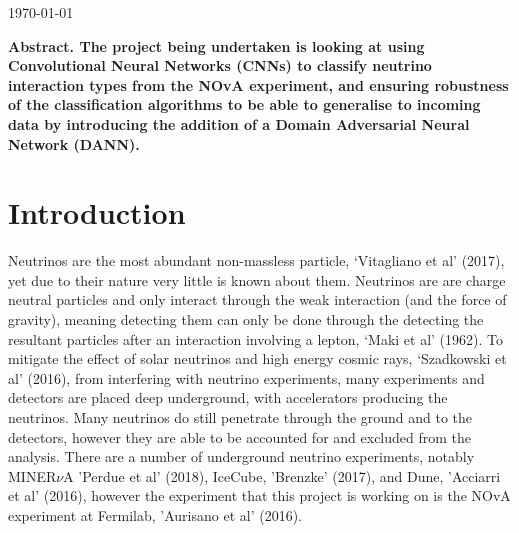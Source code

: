 \documentclass[11pt]{article}
\begin{document}
\begin{titlepage}
	
	
	\vfill\vfill\vfill %
	
	{\large\today} %
	
	
	 	
\end{titlepage}

\newenvironment{scilastnote}{%
\setcounter{lastnote}{\value{enumiv}}%
\addtocounter{lastnote}{+1}%
\begin{list}%
{\arabic{lastnote}.}
{\setlength{\leftmargin}{.22in}}
{\setlength{\labelsep}{.5em}}}
{\end{list}}

\textbf{Abstract. The project being undertaken is looking at using Convolutional Neural Networks (CNNs) to classify neutrino interaction types from the NOvA experiment, and ensuring robustness of the classification algorithms to be able to generalise to incoming data by introducing the addition of a Domain Adversarial Neural Network (DANN).}
\section*{Introduction}

Neutrinos are the most abundant non-massless particle, ‘Vitagliano et al’ (2017), yet due to their nature very little is known about them. Neutrinos are are charge neutral particles and only interact through the weak interaction (and the force of gravity), meaning detecting them can only be done through the detecting the resultant particles after an interaction involving a lepton, ‘Maki et al’ (1962). To mitigate the effect of solar neutrinos and high energy cosmic rays, ‘Szadkowski et al’ (2016), from interfering with neutrino experiments, many experiments and detectors are placed deep underground, with accelerators producing the neutrinos. Many neutrinos do still penetrate through the ground and to the detectors, however they are able to be accounted for and excluded from the analysis. There are a number of underground neutrino experiments, notably MINER$\nu$A 'Perdue et al' (2018), IceCube, 'Brenzke' (2017), and Dune, 'Acciarri et al' (2016), however the experiment that this project is working on is the NOvA experiment at Fermilab, 'Aurisano et al' (2016).
\end{document}

